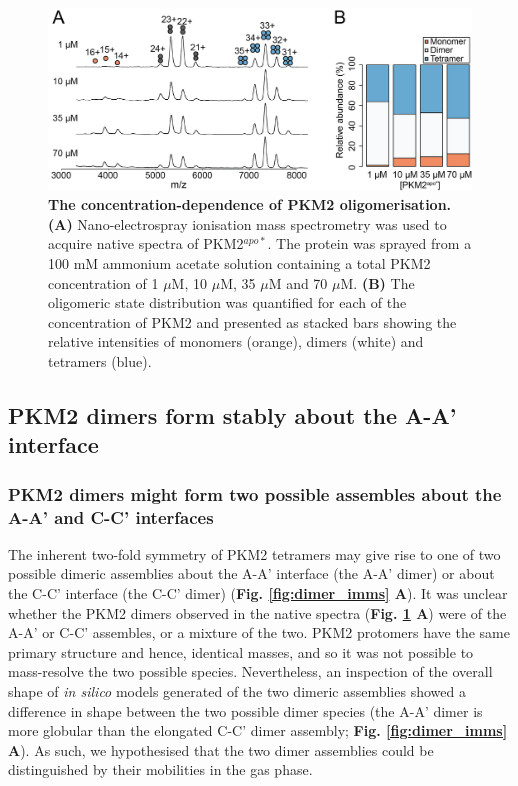 %
%
%
%
%
\begin{figure}[!ht]
\includegraphics[scale=0.8]{ch5_fig1_pkm2conc.png}
\caption[The concentration-dependence of PKM2 oligomerisation.] {\textbf{The concentration-dependence of PKM2 oligomerisation.} \textbf{(A)} Nano-electrospray ionisation mass spectrometry was used to acquire native spectra of PKM2$^{apo \ast}$. The protein was sprayed from a 100 mM ammonium acetate solution containing a total PKM2 concentration of 1 $\mu$M, 10 $\mu$M, 35 $\mu$M and 70 $\mu$M. \textbf{(B)} The oligomeric state distribution was quantified for each of the concentration of PKM2 and presented as stacked bars showing the relative intensities of monomers (orange), dimers (white) and tetramers (blue).}
\label{fig:pkm2_conc}
\end{figure}
%
%
\clearpage


\subsection{PKM2 dimers form stably about the A-A' interface}
\label{subsec:aa_dimer_imms}

\subsubsection{PKM2 dimers might form two possible assembles about the A-A' and C-C' interfaces}
The inherent two-fold symmetry of PKM2 tetramers may give rise to one of two possible dimeric assemblies about the A-A' interface (the A-A' dimer) or about the C-C' interface (the C-C' dimer) (\textbf{Fig. \ref{fig:dimer_imms} A}). It was unclear whether the PKM2 dimers observed in the native spectra (\textbf{Fig. \ref{fig:pkm2_conc} A}) were of the A-A' or C-C' assembles, or a mixture of the two. PKM2 protomers have the same primary structure and hence, identical masses, and so it was not possible to mass-resolve the two possible species. Nevertheless, an inspection of the overall shape of \textit{in silico} models generated of the two dimeric assemblies showed a difference in shape between the two possible dimer species (the A-A' dimer is more globular than the elongated C-C' dimer assembly; \textbf{Fig. \ref{fig:dimer_imms} A}). As such, we hypothesised that the two dimer assemblies could be distinguished by their mobilities in the gas phase.

